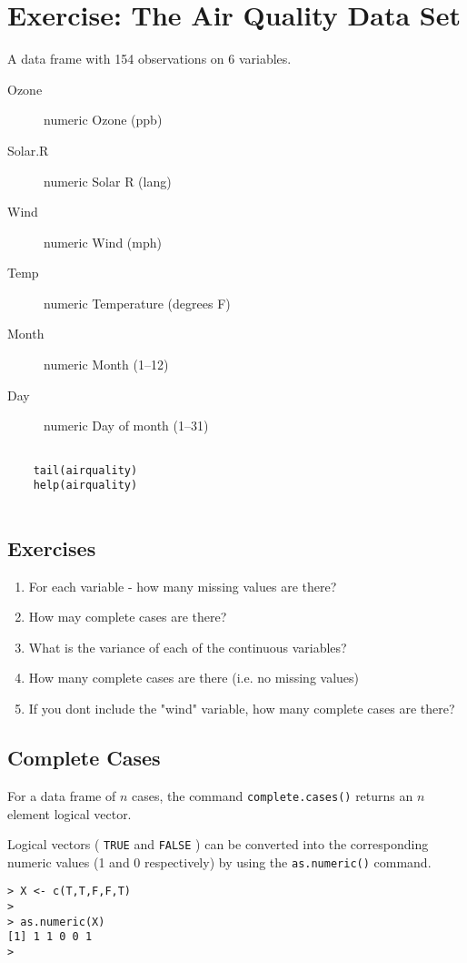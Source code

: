 

\section{Exercise:  The Air Quality Data Set}

A data frame with 154 observations on 6 variables.

\begin{description}
\item[Ozone]	numeric	Ozone (ppb)
\item[Solar.R]	numeric	Solar R (lang)
\item[Wind]	numeric	Wind (mph)
\item[Temp]	numeric	Temperature (degrees F)
\item[Month]	numeric	Month (1--12)
\item[Day]	numeric	Day of month (1--31)
\end{description}
\begin{framed}
	\begin{verbatim}
	
	tail(airquality)
	help(airquality)
	
	\end{verbatim}
\end{framed}

\subsection{Exercises}
\begin{enumerate}
	\item For each variable - how many missing values are there?
	\item How may complete cases are there? 
	\item What is the variance of each of the continuous variables?
	\item How many complete cases are there (i.e. no missing values)
	\item If you dont include the "wind" variable, how many complete cases are there?
\end{enumerate}
\subsection{Complete Cases}
For a data frame of $n$ cases, the command \texttt{complete.cases()} returns an $n$ element logical vector.

Logical vectors ( \texttt{TRUE} and \texttt{FALSE} ) can be converted into the corresponding numeric values (1 and 0 respectively) by using the \texttt{as.numeric()} command.

\begin{framed}
	\begin{verbatim}
> X <- c(T,T,F,F,T)
>
> as.numeric(X)
[1] 1 1 0 0 1
>
	\end{verbatim}
\end{framed}
